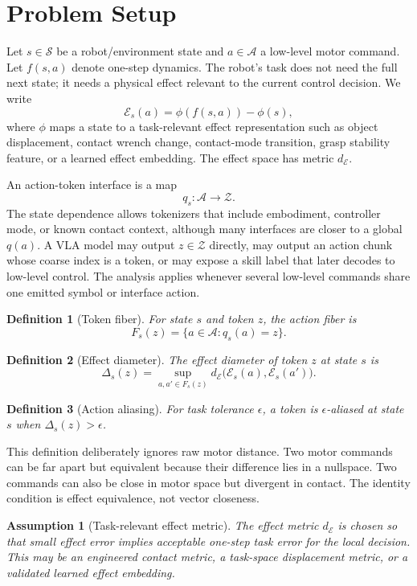 \documentclass{article}
\newtheorem{definition}{Definition}
\newtheorem{assumption}{Assumption}
\newcommand{\A}{\mathcal{A}}
\newcommand{\Sspace}{\mathcal{S}}
\newcommand{\Z}{\mathcal{Z}}
\newcommand{\E}{\mathcal{E}}
\begin{document}
\section{Problem Setup}

Let $s\in\Sspace$ be a robot/environment state and $a\in\A$ a low-level motor
command. Let $f(s,a)$ denote one-step dynamics. The robot's task does not need
the full next state; it needs a physical effect relevant to the current control
decision. We write
\[
    \E_s(a)=\phi(f(s,a))-\phi(s),
\]
where $\phi$ maps a state to a task-relevant effect representation such as
object displacement, contact wrench change, contact-mode transition, grasp
stability feature, or a learned effect embedding. The effect space has metric
$d_\E$.

An action-token interface is a map
\[
    q_s:\A\rightarrow\Z .
\]
The state dependence allows tokenizers that include embodiment, controller
mode, or known contact context, although many interfaces are closer to a global
$q(a)$. A VLA model may output $z\in\Z$ directly, may output an action chunk
whose coarse index is a token, or may expose a skill label that later decodes
to low-level control. The analysis applies whenever several low-level commands
share one emitted symbol or interface action.

\begin{definition}[Token fiber]
For state $s$ and token $z$, the action fiber is
\[
    F_s(z)=\{a\in\A:q_s(a)=z\}.
\]
\end{definition}

\begin{definition}[Effect diameter]
The effect diameter of token $z$ at state $s$ is
\[
    \Delta_s(z)=
    \sup_{a,a'\in F_s(z)}
    d_\E\bigl(\E_s(a),\E_s(a')\bigr).
\]
\end{definition}

\begin{definition}[Action aliasing]
For task tolerance $\epsilon$, a token is $\epsilon$-aliased at state $s$ when
$\Delta_s(z)>\epsilon$.
\end{definition}

This definition deliberately ignores raw motor distance. Two motor commands can
be far apart but equivalent because their difference lies in a nullspace. Two
commands can also be close in motor space but divergent in contact. The
identity condition is effect equivalence, not vector closeness.

\begin{assumption}[Task-relevant effect metric]
The effect metric $d_\E$ is chosen so that small effect error implies acceptable
one-step task error for the local decision. This may be an engineered contact
metric, a task-space displacement metric, or a validated learned effect
embedding.
\end{assumption}
\end{document}
